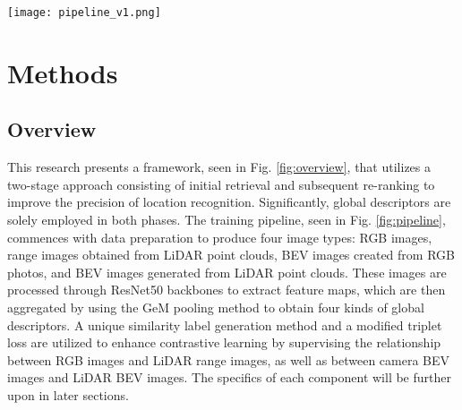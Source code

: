 \begin{figure*}[t]
    \centering
    \texttt{[image: pipeline\_v1.png]}
    \caption{The training pipeline to produce the range (or RGB) and BEV descriptors. raw data (e.g., LiDAR point cloud, camera RGB image) are preprocessed to reduce modality differences and improve the overlap in visual content. Featrue maps are generated by extracting features from RGB, LiDAR range, camera BEV and LiDAR BEV, which are latter aggregated by the Generalized Mean (GeM) pooling to abtain global descriptors. It's worth noting that we use the points average distance together with a generalized triplet loss to supervise the learning process and fully utilize the limited training data}
    \label{fig:pipeline}
\end{figure*}
\section{Methods}
\subsection{Overview}
This research presents a framework, seen in Fig. \ref{fig:overview}, that utilizes a two-stage approach consisting of initial retrieval and subsequent re-ranking to improve the precision of location recognition. Significantly, global descriptors are solely employed in both phases. The training pipeline, seen in Fig. \ref{fig:pipeline}, commences with data preparation to produce four image types: RGB images, range images obtained from LiDAR point clouds, BEV images created from RGB photos, and BEV images generated from LiDAR point clouds. These images are processed through ResNet50 \cite{he2016deep} backbones to extract feature maps, which are then aggregated by using the GeM pooling \cite{radenovic2018fine} method to obtain four kinds of global descriptors. A unique similarity label generation method and a modified triplet loss \cite{schroff2015facenet} are utilized to enhance contrastive learning by supervising the relationship between RGB images and LiDAR range images, as well as between camera BEV images and LiDAR BEV images. The specifics of each component will be further upon in later sections.

